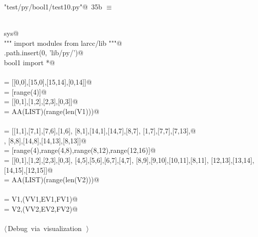\documentclass[11pt,oneside]{article}	%
\begin{document}
\begin{flushleft} \small \label{scrap44}
\protect{}\verb@"test/py/bool1/test10.py"@\nobreak\ {\footnotesize 35b }$\equiv$
\vspace{-1ex}
\begin{list}{}{} \item
\mbox{}\verb@@\\
\mbox{}\verb@import sys@\\
\mbox{}\verb@""" import modules from larcc/lib """@\\
\mbox{}\verb@sys.path.insert(0, 'lib/py/')@\\
\mbox{}\verb@from bool1 import *@\\
\mbox{}\verb@@\\
\mbox{} = [[0,0],[15,0],[15,14],[0,14]]@\\
\mbox{} = [range(4)]@\\
\mbox{} = [[0,1],[1,2],[2,3],[0,3]]@\\
\mbox{} = AA(LIST)(range(len(V1)))@\\
\mbox{}\verb@@\\
\mbox{} = [[1,1],[7,1],[7,6],[1,6], [8,1],[14,1],[14,7],[8,7], [1,7],[7,7],[7,13],@\\
\mbox{}\verb@      [1,13], [8,8],[14,8],[14,13],[8,13]]@\\
\mbox{} = [range(4),range(4,8),range(8,12),range(12,16)]@\\
\mbox{} = [[0,1],[1,2],[2,3],[0,3], [4,5],[5,6],[6,7],[4,7], [8,9],[9,10],[10,11],[8,11], [12,13],[13,14],[14,15],[12,15]]@\\
\mbox{} = AA(LIST)(range(len(V2)))@\\
\mbox{}\verb@@\\
\mbox{} = V1,(VV1,EV1,FV1)@\\
\mbox{} = V2,(VV2,EV2,FV2)@\\
\mbox{}\verb@@\\
\mbox{}\verb@@\hbox{$\langle\,$Debug via visualization\nobreak\ {\footnotesize {}}$\,\rangle$}\verb@@\\
\mbox{}\verb@@{\NWsep}
\end{list}
\vspace{-2ex}
\end{flushleft}
\end{document}
